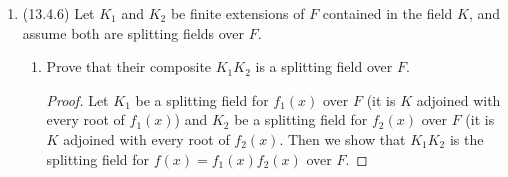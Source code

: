\documentclass[11pt]{article}
\begin{document}
\begin{enumerate}
\begin{proof}
        Conversely, write $K$ as $F(\alpha_1,\dots,\alpha_n)$ and suppose that every irreducible polynomial with a root in $K$ splits completely. Consider the minimal polynomials $m_{\alpha_i}(x)\in F[x]$ for each $\alpha_i$. We show that $K$ is the splitting field for $f(x) = \prod_{i=1}^n m_{\alpha_i}(x)$ over $F$. It is true that each of the minimal polynomials has a root in $K$, so each splits completely; as a result $f(x)$ does in $K$ also. So the splitting field for $f(x)$ over $F$ is contained in $K$. The reverse inclusion is obtained by taking the minimal polynomial for any element in the splitting field and observing that such an element is a root of one of the $m_{\alpha_i}(x)$, meaning it must be in $K$ as assumed. Hence $K$ is a splitting field over $F$. 
    \end{proof}
    \item (13.4.6) Let $K_1$ and $K_2$ be finite extensions of $F$ contained in the field $K$, and assume both are splitting fields over $F$. \begin{enumerate}
        \item Prove that their composite $K_1K_2$ is a splitting field over $F$. \begin{proof}
            Let $K_1$ be a splitting field for $f_1(x)$ over $F$ (it is $K$ adjoined with every root of $f_1(x)$) and $K_2$ be a splitting field for $f_2(x)$ over $F$ (it is $K$ adjoined with every root of $f_2(x)$. Then we show that $K_1K_2$ is the splitting field for $f(x) = f_1(x)f_2(x)$ over $F$.


\end{proof}
\end{enumerate}
\end{enumerate}
\end{document}
